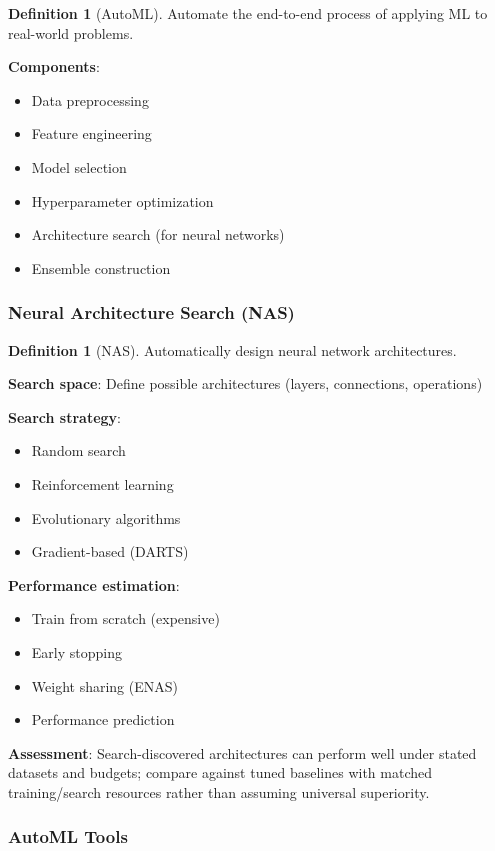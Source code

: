 \documentclass[11pt,twoside]{article}
\numberwithin{equation}{section}
\theoremstyle{plain}
\theoremstyle{definition}
\newtheorem{definition}[theorem]{Definition}
\theoremstyle{remark}
\begin{document}
\begin{definition}[AutoML]
Automate the end-to-end process of applying ML to real-world problems.

\textbf{Components}:
\begin{itemize}
\item Data preprocessing
\item Feature engineering
\item Model selection
\item Hyperparameter optimization
\item Architecture search (for neural networks)
\item Ensemble construction
\end{itemize}
\end{definition}

\subsubsection{Neural Architecture Search (NAS)}

\begin{definition}[NAS]
Automatically design neural network architectures.

\textbf{Search space}: Define possible architectures (layers, connections, operations)

\textbf{Search strategy}:
\begin{itemize}
\item Random search
\item Reinforcement learning
\item Evolutionary algorithms
\item Gradient-based (DARTS)
\end{itemize}

\textbf{Performance estimation}:
\begin{itemize}
\item Train from scratch (expensive)
\item Early stopping
\item Weight sharing (ENAS)
\item Performance prediction
\end{itemize}

\textbf{Assessment}: Search-discovered architectures can perform well under stated datasets and budgets; compare against tuned baselines with matched training/search resources rather than assuming universal superiority.
\end{definition}

\subsubsection{AutoML Tools}
\end{document}

